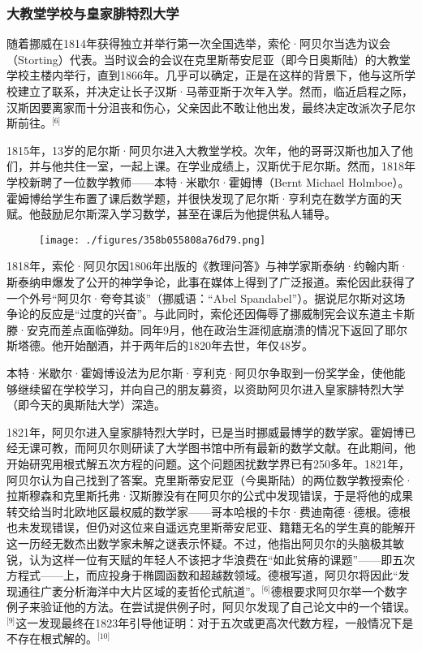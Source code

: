 \subsubsection{大教堂学校与皇家腓特烈大学}
随着挪威在1814年获得独立并举行第一次全国选举，索伦·阿贝尔当选为议会（Storting）代表。当时议会的会议在克里斯蒂安尼亚（即今日奥斯陆）的大教堂学校主楼内举行，直到1866年。几乎可以确定，正是在这样的背景下，他与这所学校建立了联系，并决定让长子汉斯·马蒂亚斯于次年入学。然而，临近启程之际，汉斯因要离家而十分沮丧和伤心，父亲因此不敢让他出发，最终决定改派次子尼尔斯前往。\(^\text{[6]}\)

1815年，13岁的尼尔斯·阿贝尔进入大教堂学校。次年，他的哥哥汉斯也加入了他们，并与他共住一室，一起上课。在学业成绩上，汉斯优于尼尔斯。然而，1818年学校新聘了一位数学教师——本特·米歇尔·霍姆博（Bernt Michael Holmboe）。霍姆博给学生布置了课后数学题，并很快发现了尼尔斯·亨利克在数学方面的天赋。他鼓励尼尔斯深入学习数学，甚至在课后为他提供私人辅导。
\begin{figure}[ht]
\centering
\texttt{[image: ./figures/358b055808a76d79.png]}
\caption{} \label{fig_NRSAB_1}
\end{figure}
1818年，索伦·阿贝尔因1806年出版的《教理问答》与神学家斯泰纳·约翰内斯·斯泰纳申爆发了公开的神学争论，此事在媒体上得到了广泛报道。索伦因此获得了一个外号“阿贝尔·夸夸其谈”（挪威语：“Abel Spandabel”）。据说尼尔斯对这场争论的反应是“过度的兴奋”。与此同时，索伦还因侮辱了挪威制宪会议东道主卡斯滕·安克而差点面临弹劾。同年9月，他在政治生涯彻底崩溃的情况下返回了耶尔斯塔德。他开始酗酒，并于两年后的1820年去世，年仅48岁。

本特·米歇尔·霍姆博设法为尼尔斯·亨利克·阿贝尔争取到一份奖学金，使他能够继续留在学校学习，并向自己的朋友募资，以资助阿贝尔进入皇家腓特烈大学（即今天的奥斯陆大学）深造。

1821年，阿贝尔进入皇家腓特烈大学时，已是当时挪威最博学的数学家。霍姆博已经无课可教，而阿贝尔则研读了大学图书馆中所有最新的数学文献。在此期间，他开始研究用根式解五次方程的问题。这个问题困扰数学界已有250多年。1821年，阿贝尔认为自己找到了答案。克里斯蒂安尼亚（今奥斯陆）的两位数学教授索伦·拉斯穆森和克里斯托弗·汉斯滕没有在阿贝尔的公式中发现错误，于是将他的成果转交给当时北欧地区最权威的数学家——哥本哈根的卡尔·费迪南德·德根。德根也未发现错误，但仍对这位来自遥远克里斯蒂安尼亚、籍籍无名的学生真的能解开这一历经无数杰出数学家未解之谜表示怀疑。不过，他指出阿贝尔的头脑极其敏锐，认为这样一位有天赋的年轻人不该把才华浪费在“如此贫瘠的课题”——即五次方程式——上，而应投身于椭圆函数和超越数领域。德根写道，阿贝尔将因此“发现通往广袤分析海洋中大片区域的麦哲伦式航道”。\(^\text{[6]}\)德根要求阿贝尔举一个数字例子来验证他的方法。在尝试提供例子时，阿贝尔发现了自己论文中的一个错误。\(^\text{[9]}\)这一发现最终在1823年引导他证明：对于五次或更高次代数方程，一般情况下是不存在根式解的。\(^\text{[10]}\)

